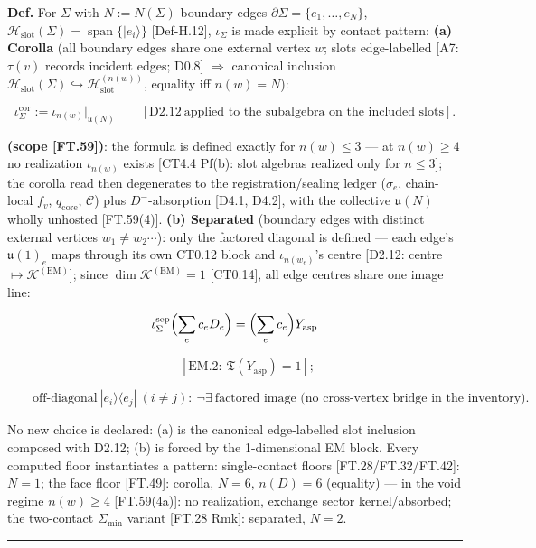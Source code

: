 \begin{definition}\label{tag:Def-H-22}
\textbf{Def.} For $\Sigma$ with $N:=N(\Sigma)$ boundary edges $\partial\Sigma=\{e_1,\dots,e_N\}$, $\mathcal H_{\mathrm{slot}}(\Sigma)=\operatorname{span}\{|e_i\rangle\}$ [Def-H.12], $\iota_\Sigma$ is made explicit by contact pattern: \textbf{(a) Corolla} (all boundary edges share one external vertex $w$; slots edge-labelled [A7: $\tau(v)$ records incident edges; D0.8] $\Rightarrow$ canonical inclusion $\mathcal H_{\mathrm{slot}}(\Sigma)\hookrightarrow\mathcal H^{(n(w))}_{\mathrm{slot}}$, equality iff $n(w)=N$):

\[
\iota_\Sigma^{\mathrm{cor}}:=\iota_{n(w)}\big|_{\mathfrak u(N)}\qquad[\mathrm{D2.12}\ \text{applied to the subalgebra on the included slots}].
\]

\textbf{(scope [FT.59])}: the formula is defined exactly for $n(w)\le3$ — at $n(w)\ge4$ no realization $\iota_{n(w)}$ exists [CT4.4 Pf(b): slot algebras realized only for $n\le3$]; the corolla read then degenerates to the registration/sealing ledger ($\sigma_e$, chain-local $f_v$, $q_{\mathrm{core}}$, $\mathcal C$) plus $D^-$-absorption [D4.1, D4.2], with the collective $\mathfrak u(N)$ wholly unhosted [FT.59(4)]. \textbf{(b) Separated} (boundary edges with distinct external vertices $w_1\ne w_2\cdots$): only the factored diagonal is defined — each edge's $\mathfrak u(1)_e$ maps through its own CT0.12 block and $\iota_{n(w_e)}$'s centre [D2.12: centre $\mapsto\mathcal K^{(\mathrm{EM})}$]; since $\dim\mathcal K^{(\mathrm{EM})}=1$ [CT0.14], all edge centres share one image line:

\[
\iota_\Sigma^{\mathrm{sep}}\Bigl(\sum_ec_eD_e\Bigr)=\Bigl(\sum_ec_e\Bigr)Y_{\mathrm{asp}}
\]

\[
\qquad [\mathrm{EM.2}:\ \mathfrak T(Y_{\mathrm{asp}})=1];
\]

\[
\qquad \text{off-diagonal}\ |e_i\rangle\langle e_j|\ (i\ne j):\ \neg\exists\ \text{factored image (no cross-vertex bridge in the inventory)}.
\]

No new choice is declared: (a) is the canonical edge-labelled slot inclusion composed with D2.12; (b) is forced by the 1-dimensional EM block. Every computed floor instantiates a pattern: single-contact floors [FT.28/FT.32/FT.42]: $N=1$; the face floor [FT.49]: corolla, $N=6$, $n(D)=6$ (equality) — in the void regime $n(w)\ge4$ [FT.59(4a)]: no realization, exchange sector kernel/absorbed; the two-contact $\Sigma_{\min}$ variant [FT.28 Rmk]: separated, $N=2$.

\vspace{2pt}\noindent\rule{\textwidth}{0.4pt}\vspace{2pt}

\end{definition}

